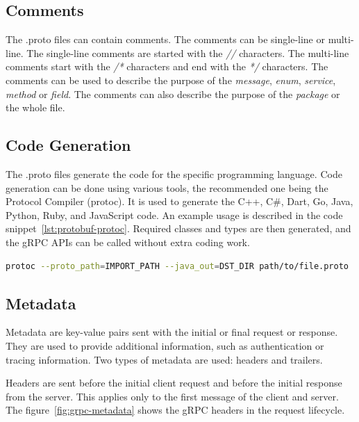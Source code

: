 \subsection{Comments}
The .proto files can contain comments.
The comments can be single-line or multi-line.
The single-line comments are started with the \textit{//} characters.
The multi-line comments start with the \textit{/*} characters and end with the \textit{*/} characters.
The comments can be used to describe the purpose of the \textit{message}, \textit{enum}, \textit{service}, \textit{method} or \textit{field}.
The comments can also describe the purpose of the \textit{package} or the whole file.
\cite{protobuf-proto3}

\subsection{Code Generation}
The .proto files generate the code for the specific programming language.
Code generation can be done using various tools, the recommended one being the Protocol Compiler (protoc).
It is used to generate the C++, C\#, Dart, Go, Java, Python, Ruby, and JavaScript code.
An example usage is described in the code snippet~\ref{lst:protobuf-protoc}.
Required classes and types are then generated, and the gRPC APIs can be called without extra coding work.
\cite{protobuf-proto3}

\begin{lstlisting}[language=bash, caption={Protocol Buffers Code Generation~\cite{protobuf-proto3}}, label={lst:protobuf-protoc}]
protoc --proto_path=IMPORT_PATH --java_out=DST_DIR path/to/file.proto
\end{lstlisting}

\subsection{Metadata}
Metadata are key-value pairs sent with the initial or final request or response.
They are used to provide additional information, such as authentication or tracing information.
Two types of metadata are used: headers and trailers.

Headers are sent before the initial client request and before the initial response from the server.
This applies only to the first message of the client and server.
The figure~\ref{fig:grpc-metadata} shows the gRPC headers in the request lifecycle.

